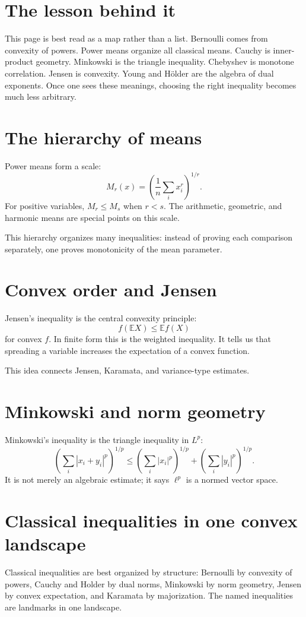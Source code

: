 \section{The lesson behind it}

This page is best read as a map rather than a list.  Bernoulli comes from convexity of powers.  Power means organize all classical means.  Cauchy is inner-product geometry.  Minkowski is the triangle inequality.  Chebyshev is monotone correlation.  Jensen is convexity.  Young and Hölder are the algebra of dual exponents.  Once one sees these meanings, choosing the right inequality becomes much less arbitrary.

\section{The hierarchy of means}

Power means form a scale:
\[
  M_r(x)=\left(\frac1n\sum_i x_i^r\right)^{1/r}.
\]
For positive variables, \(M_r\le M_s\) when \(r<s\).  The arithmetic, geometric, and harmonic means are special points on this scale.

This hierarchy organizes many inequalities: instead of proving each comparison separately, one proves monotonicity of the mean parameter.

\section{Convex order and Jensen}

Jensen's inequality is the central convexity principle:
\[
  f(\mathbb E X)\le \mathbb E f(X)
\]
for convex \(f\).  In finite form this is the weighted inequality.  It tells us that spreading a variable increases the expectation of a convex function.

This idea connects Jensen, Karamata, and variance-type estimates.

\section{Minkowski and norm geometry}

Minkowski's inequality is the triangle inequality in \(L^p\):
\[
  \left(\sum_i |x_i+y_i|^p\right)^{1/p}\le \left(\sum_i |x_i|^p\right)^{1/p}+\left(\sum_i |y_i|^p\right)^{1/p}.
\]
It is not merely an algebraic estimate; it says \(\ell^p\) is a normed vector space.

\section{Classical inequalities in one convex landscape}

Classical inequalities are best organized by structure: Bernoulli by convexity of powers, Cauchy and Holder by dual norms, Minkowski by norm geometry, Jensen by convex expectation, and Karamata by majorization.  The named inequalities are landmarks in one landscape.
